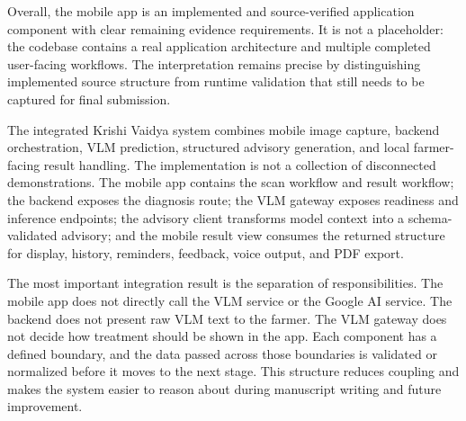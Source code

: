Overall, the mobile app is an implemented and source-verified application component with clear
remaining evidence requirements. It is not a placeholder: the codebase contains a real
application architecture and multiple completed user-facing workflows. The interpretation remains
precise by distinguishing implemented source structure from runtime validation that still needs to
be captured for final submission.



The integrated Krishi Vaidya system combines mobile image capture, backend orchestration, VLM
prediction, structured advisory generation, and local farmer-facing result handling. The
implementation is not a collection of disconnected demonstrations. The mobile app contains the
scan workflow and result workflow; the backend exposes the diagnosis route; the VLM gateway
exposes readiness and inference endpoints; the advisory client transforms model context into a
schema-validated advisory; and the mobile result view consumes the returned structure for display,
history, reminders, feedback, voice output, and PDF export.

The most important integration result is the separation of responsibilities. The mobile app does
not directly call the VLM service or the Google AI service. The backend does not present raw VLM
text to the farmer. The VLM gateway does not decide how treatment should be shown in the app. Each
component has a defined boundary, and the data passed across those boundaries is validated or
normalized before it moves to the next stage. This structure reduces coupling and makes the system
easier to reason about during manuscript writing and future improvement.

